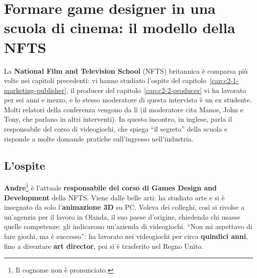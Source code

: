 
\chapter[Formare game designer: la NFTS]{Formare game designer in una scuola di
cinema: il modello della NFTS}
\label{cap:c2-4-nfts}

La \textbf{National Film and Television School} (NFTS) britannica è comparsa più
volte nei capitoli precedenti: vi hanno studiato l'ospite del
capitolo~\ref{cap:c2-1-marketing-publisher}, il producer del
capitolo~\ref{cap:c2-2-producer} vi ha lavorato per sei anni e mezzo, e lo stesso
moderatore di questa intervista è un ex studente. Molti relatori della conferenza
vengono da lì (il moderatore cita Manos, John e Tony, che parlano in altri
interventi). In questo incontro, in inglese, parla il responsabile del corso di
videogiochi, che spiega ``il segreto'' della scuola e risponde a molte domande
pratiche sull'ingresso nell'industria.

\section{L'ospite}
\label{sec:c2-4-ospite}

\textbf{Andre}\footnote{Il cognome non è pronunciato.} è l'attuale
\textbf{responsabile del corso di Games Design and Development} della NFTS. Viene
dalle belle arti: ha studiato arte e si è insegnato da solo l'\textbf{animazione 3D}
su PC. Voleva dei colleghi, così si rivolse a un'agenzia per il lavoro in Olanda,
il suo paese d'origine, chiedendo chi usasse quelle competenze: gli indicarono
un'azienda di videogiochi. ``Non mi aspettavo di fare giochi, ma è successo'': ha
lavorato nei videogiochi per circa \textbf{quindici anni}, fino a diventare
\textbf{art director}, poi si è trasferito nel Regno Unito.

